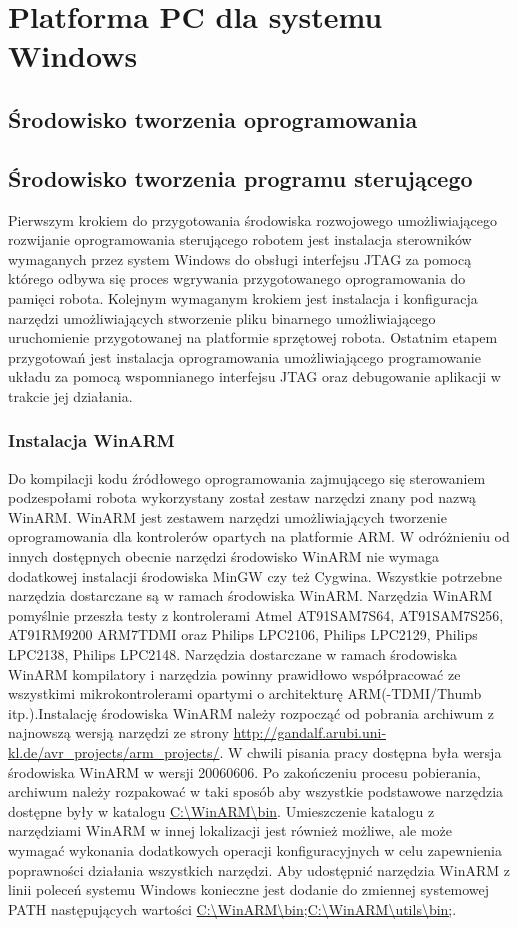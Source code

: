 \section{Platforma PC dla systemu Windows}
\subsection{Środowisko tworzenia oprogramowania}
\subsection{Środowisko tworzenia programu sterującego}
Pierwszym krokiem do przygotowania środowiska rozwojowego umożliwiającego
rozwijanie oprogramowania sterującego robotem jest instalacja sterowników
wymaganych przez system Windows do obsługi interfejsu JTAG za pomocą którego
odbywa się proces wgrywania przygotowanego oprogramowania do pamięci robota.
Kolejnym wymaganym krokiem jest instalacja i konfiguracja narzędzi
umożliwiających stworzenie pliku binarnego umożliwiającego uruchomienie
przygotowanej na platformie sprzętowej robota. Ostatnim etapem przygotowań jest
instalacja oprogramowania umożliwiającego programowanie układu za pomocą
wspomnianego interfejsu JTAG oraz debugowanie aplikacji w trakcie jej działania.
\subsubsection{Instalacja WinARM}
Do kompilacji kodu źródłowego oprogramowania zajmującego się sterowaniem
podzespołami robota wykorzystany został zestaw narzędzi znany pod nazwą WinARM.
WinARM jest zestawem narzędzi umożliwiających tworzenie oprogramowania dla
kontrolerów opartych na platformie ARM. W odróżnieniu od innych dostępnych
obecnie narzędzi środowisko WinARM nie wymaga dodatkowej instalacji środowiska
MinGW czy też Cygwina. Wszystkie potrzebne narzędzia dostarczane są w ramach
środowiska WinARM. Narzędzia WinARM pomyślnie przeszła testy z kontrolerami Atmel
AT91SAM7S64, AT91SAM7S256, AT91RM9200 ARM7TDMI oraz Philips LPC2106, Philips
LPC2129, Philips LPC2138, Philips LPC2148. Narzędzia dostarczane w ramach
środowiska WinARM kompilatory i narzędzia powinny prawidłowo współpracować ze
wszystkimi mikrokontrolerami opartymi o architekturę ARM(-TDMI/Thumb
itp.).\newline \newline Instalację środowiska WinARM należy rozpocząć od pobrania
archiwum z najnowszą wersją narzędzi ze strony
\url{http://gandalf.arubi.uni-kl.de/avr_projects/arm_projects/}. W chwili pisania
pracy dostępna była wersja środowiska WinARM w wersji 20060606. Po zakończeniu
procesu pobierania, archiwum należy rozpakować w taki sposób aby wszystkie
podstawowe narzędzia dostępne były w katalogu \url{C:\WinARM\bin}. Umieszczenie
katalogu z narzędziami WinARM w innej lokalizacji jest również możliwe, ale może
wymagać wykonania dodatkowych operacji konfiguracyjnych w celu zapewnienia
poprawności działania wszystkich narzędzi. Aby udostępnić narzędzia WinARM z
linii poleceń systemu Windows konieczne jest dodanie do zmiennej systemowej PATH
następujących wartości \url{C:\WinARM\bin;C:\WinARM\utils\bin;}.
